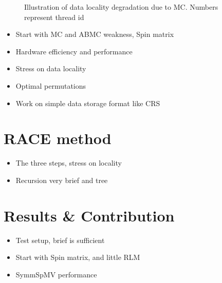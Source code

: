 \begin{figure}[b]
	\centering
	\hspace{0.5em}
	\caption{Illustration of data locality degradation due to \acrshort{MC}.
		Numbers represent thread id}
\end{figure}

\begin{itemize}
	\item Start with MC and ABMC weakness, Spin matrix
	\item Hardware efficiency and performance
	\item Stress on data locality
	\item Optimal permutations
	\item Work on simple data storage format like \acrshort{CRS}
\end{itemize}


\section{RACE method} \label{sec:RACE_method}
\begin{itemize}
	\item The three steps, stress on locality
	\item Recursion very brief and tree
\end{itemize}


\section{Results \& Contribution} \label{sec:results}
\begin{itemize}
	\item Test setup, brief is sufficient
	\item Start with Spin matrix, and little RLM
	\item SymmSpMV performance
\end{itemize}
